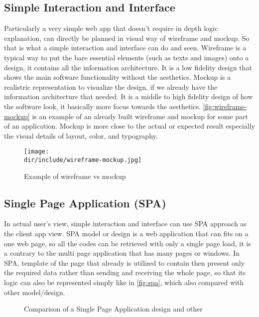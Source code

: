 \subsection{Simple Interaction and Interface}
\label{ssec:simple-interfaction}

Particularly a very simple web app that doesn't require in depth logic explanation, can directly be planned in visual way of wireframe and mockup.
So that is what a simple interaction and interface can do and seen.
Wireframe is a typical way to put the bare essential elements (such as texts and images) onto a design, it contains all the information architecture.
It is a low fidelity design that shows the main software functionality without the aesthetics.
Mockup is a realistric representation to visualize the design, if we already have the information architecture that needed.
It is a middle to high fidelity design of how the software look, it basically more focus towards the aesthetics.
\autoref{fig:wireframe-mockup} is an example of an already built wireframe and mockup for some part of an application.
Mockup is more close to the actual or expected result especially the visual details of layout, color, and typography.

\begin{figure}[htbp]
    \centering
    \texttt{[image: \\dir/include/wireframe-mockup.jpg]}
    \caption[Wireframe vs Mockup Example]{Example of wireframe vs mockup \autocite{Trentini2015WM}}
    \label{fig:wireframe-mockup}
\end{figure}

\subsection{Single Page Application (SPA)}
\label{ssec:spa}

In actual user's view, simple interaction and interface can use \ac{SPA} approach as the client app view.
\ac{SPA} model or design is a web application that can fits on a one web page, so all the codes can be retrieved with only a single page load, it is a contrary to the multi page application that has many pages or windows.
In \ac{SPA}, template of the page that already is utilized to contain then present only the required data rather than sending and receiving the whole page, so that its logic can also be represented simply like in \autoref{fig:spa}, which also compared with other model/design.

\begin{figure}[htbp]
    \centering
    \caption[Single Page Application design comparison]{Comparison of a Single Page Application design and other}
    \label{fig:spa}
\end{figure}
